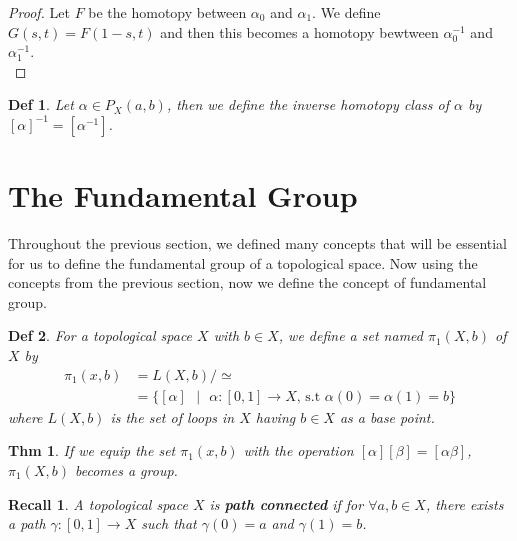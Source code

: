 \documentclass[paper=a4, fontsize=11pt]{scrartcl}
\newtheorem{theorem}{Thm}
\newtheorem{definition}{Def}
\newtheorem*{recall}{Recall}
\begin{document}
\begin{proof}
	Let $F$ be the homotopy between $\alpha_0$ and $\alpha_1$. We define $G(s,t)=F(1-s,t)$ and then this becomes a homotopy bewtween  $\alpha_0^{-1}$ and $\alpha_1^{-1}$. \\
\end{proof}

\begin{definition}
	Let $\alpha \in P_X(a,b)$, then we define the inverse homotopy class of $\alpha$ by $[\alpha]^{-1} = [\alpha^{-1}]$.\\
\end{definition}
\vspace{0.15in}


\section{The Fundamental Group}
\vspace{0.15in}
Throughout the previous section, we defined many concepts that will be essential for us to define the fundamental group of a topological space. Now using the concepts from the previous section, now we define the concept of fundamental group.\\

\begin{definition}
	For a topological space $X$ with $b \in X$, we define a set named $\pi_1(X,b)$ of $X$ by
	\begin{equation}\nonumber
		\begin{split}
		\pi_1(x,b) &= L(X,b)/\simeq\\
		&= \{[\alpha] \text{ }|\text{ } \alpha : [0,1] \to X \text{, s.t } \alpha(0)=\alpha(1)=b\}
		\end{split}
	\end{equation}
	where $L(X,b)$ is the set of loops in $X$ having $b \in X$ as a base point.\\
\end{definition}

\begin{theorem}
	If we equip the set $\pi_1(x,b)$ with the operation $[\alpha][\beta]=[\alpha\beta]$, $\pi_1(X,b)$ becomes a group.\\
\end{theorem}

\begin{recall}
	A topological space $X$ is \textbf{path connected} if for $\forall a,b \in X$, there exists a path $\gamma:[0,1]\to X$ such that $\gamma(0)=a$ and $\gamma(1)=b$.\\
\end{recall}
\end{document}
